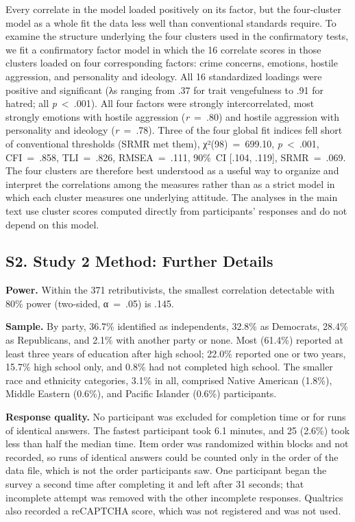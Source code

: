 Every correlate in the model loaded positively on its factor, but the four-cluster model as a whole fit the data less well than conventional standards require. To examine the structure underlying the four clusters used in the confirmatory tests, we fit a confirmatory factor model in which the 16 correlate scores in those clusters loaded on four corresponding factors: crime concerns, emotions, hostile aggression, and personality and ideology. All 16 standardized loadings were positive and significant (λs ranging from .37 for trait vengefulness to .91 for hatred; all \emph{p}~\textless{}~.001). All four factors were strongly intercorrelated, most strongly emotions with hostile aggression (\emph{r}~=~.80) and hostile aggression with personality and ideology (\emph{r}~=~.78). Three of the four global fit indices fell short of conventional thresholds (SRMR met them), χ²(98)~=~699.10, \emph{p}~\textless{}~.001, CFI~=~.858, TLI~=~.826, RMSEA~=~.111, 90\%~CI {[}.104, .119{]}, SRMR~=~.069. The four clusters are therefore best understood as a useful way to organize and interpret the correlations among the measures rather than as a strict model in which each cluster measures one underlying attitude. The analyses in the main text use cluster scores computed directly from participants' responses and do not depend on this model.

\subsection{S2. Study 2 Method: Further Details}\label{s2.-study-2-method-further-details}

\textbf{Power.} Within the 371 retributivists, the smallest correlation detectable with 80\% power (two-sided, α~=~.05) is .145.

\textbf{Sample.} By party, 36.7\% identified as independents, 32.8\% as Democrats, 28.4\% as Republicans, and 2.1\% with another party or none. Most (61.4\%) reported at least three years of education after high school; 22.0\% reported one or two years, 15.7\% high school only, and 0.8\% had not completed high school. The smaller race and ethnicity categories, 3.1\% in all, comprised Native American (1.8\%), Middle Eastern (0.6\%), and Pacific Islander (0.6\%) participants.

\textbf{Response quality.} No participant was excluded for completion time or for runs of identical answers. The fastest participant took 6.1 minutes, and 25 (2.6\%) took less than half the median time. Item order was randomized within blocks and not recorded, so runs of identical answers could be counted only in the order of the data file, which is not the order participants saw. One participant began the survey a second time after completing it and left after 31 seconds; that incomplete attempt was removed with the other incomplete responses. Qualtrics also recorded a reCAPTCHA score, which was not registered and was not used.


